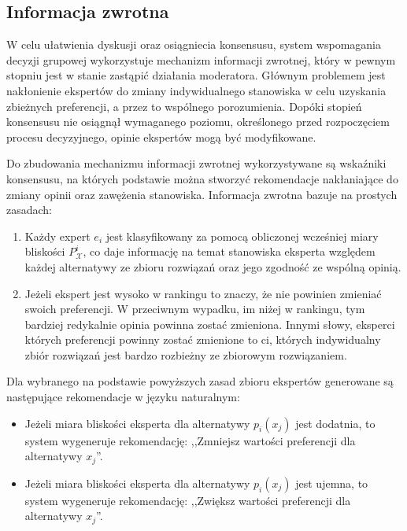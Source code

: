 \subsection{Informacja zwrotna}
W celu ułatwienia dyskusji oraz osiągniecia konsensusu, system wspomagania
decyzji grupowej wykorzystuje mechanizm informacji zwrotnej, który w pewnym
stopniu jest w stanie zastąpić działania moderatora. Głównym problemem jest
nakłonienie ekspertów do zmiany indywidualnego stanowiska w celu uzyskania
zbieżnych preferencji, a przez to wspólnego porozumienia. Dopóki stopień
konsensusu nie osiągnął wymaganego poziomu, określonego przed rozpoczęciem
procesu decyzyjnego, opinie ekspertów mogą być modyfikowane.

Do zbudowania mechanizmu informacji zwrotnej wykorzystywane są wskaźniki
konsensusu, na których podstawie można stworzyć rekomendacje nakłaniające do
zmiany opinii oraz zawężenia stanowiska. Informacja zwrotna bazuje na prostych
zasadach:
\begin{enumerate}
  \item Każdy expert $e_i$ jest klasyfikowany za pomocą obliczonej wcześniej
  miary bliskości $P^i_{\mathcal{X}}$, co daje informację na temat stanowiska
  eksperta względem każdej alternatywy ze zbioru rozwiązań oraz jego zgodność ze
  wspólną opinią.
  \item Jeżeli ekspert jest wysoko w rankingu to znaczy, że nie powinien
  zmieniać swoich preferencji. W przeciwnym wypadku, im niżej w rankingu, tym
  bardziej redykalnie opinia powinna zostać zmieniona. Innymi słowy, eksperci
  których preferencji powinny zostać zmienione to ci, których indywidualny zbiór
  rozwiązań jest bardzo rozbieżny ze zbiorowym rozwiązaniem.
\end{enumerate}
Dla wybranego na podstawie powyższych zasad zbioru ekspertów generowane są
następujące rekomendacje w języku naturalnym:
\begin{itemize}
  \item Jeżeli miara bliskości eksperta dla alternatywy $p_i(x_j)$ jest
  dodatnia, to system wygeneruje rekomendację: ,,Zmniejsz wartości preferencji
  dla alternatywy $x_j$''.
  \item Jeżeli miara bliskości eksperta dla alternatywy $p_i(x_j)$ jest ujemna,
  to system wygeneruje rekomendację: ,,Zwiększ wartości preferencji dla
  alternatywy $x_j$''.
\end{itemize}

